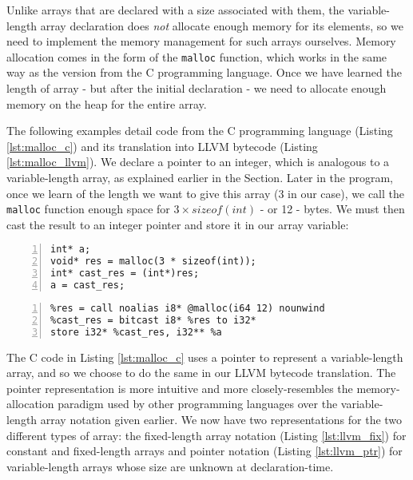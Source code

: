 Unlike arrays that are declared with a size associated with them, the variable-length array declaration does \textit{not} allocate enough memory for its elements, so we need to implement the memory management for such arrays ourselves. Memory allocation comes in the form of the \verb|malloc| function, which works in the same way as the version from the C programming language. Once we have learned the length of array - but after the initial declaration - we need to allocate enough memory on the heap for the entire array.

The following examples detail code from the C programming language (Listing \ref{lst:malloc_c}) and its translation into LLVM bytecode (Listing \ref{lst:malloc_llvm}). We declare a pointer to an integer, which is analogous to a variable-length array, as explained earlier in the Section. Later in the program, once we learn of the length we want to give this array (3 in our case), we call the \verb|malloc| function enough space for $3 \times sizeof(int)$ - or 12 - bytes. We must then cast the result to an integer pointer and store it in our array variable:

\lstset{
	language=C,
	basicstyle=\small,
	stringstyle=\ttfamily
}
\begin{lstlisting}[frame=single, numbers=left, numberstyle=\tiny, caption={C malloc}, label=lst:malloc_c]
int* a;
void* res = malloc(3 * sizeof(int));
int* cast_res = (int*)res;
a = cast_res;
\end{lstlisting}


\lstset{
	language=Assembly,
	basicstyle=\small,
	stringstyle=\ttfamily
}
\begin{lstlisting}[frame=single, numbers=left, numberstyle=\tiny, caption={LLVM malloc}, label=lst:malloc_llvm]
%a = alloca i32*
%res = call noalias i8* @malloc(i64 12) nounwind
%cast_res = bitcast i8* %res to i32*
store i32* %cast_res, i32** %a
\end{lstlisting}

The C code in Listing \ref{lst:malloc_c} uses a pointer to represent a variable-length array, and so we choose to do the same in our LLVM bytecode translation. The pointer representation is more intuitive and more closely-resembles the memory-allocation paradigm used by other programming languages over the variable-length array notation given earlier. We now have two representations for the two different types of array: the fixed-length array notation (Listing \ref{lst:llvm_fix}) for constant and fixed-length arrays and pointer notation (Listing \ref{lst:llvm_ptr}) for variable-length arrays whose size are unknown at declaration-time.

